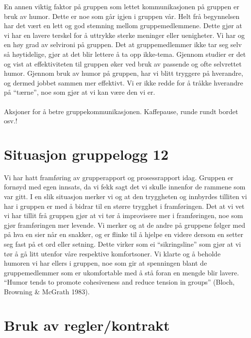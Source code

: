 En annen viktig faktor på gruppen som lettet kommunikasjonen på gruppen er bruk av humor. Dette er noe som går igjen i gruppen vår. Helt frå begynnelsen har det vært en lett og god stemning mellom gruppemedlemmene. Dette gjør at vi har en lavere terskel for å uttrykke sterke meninger eller uenigheter. Vi har og en høy grad av selvironi på gruppen. Det at gruppemedlemmer ikke tar seg selv så høytidelige, gjør at det blir lettere å ta opp ikke-tema. Gjennom studier er det og vist at effektiviteten til gruppen øker ved bruk av passende og ofte selvrettet humor. Gjennom bruk av humor på gruppen, har vi blitt tryggere på hverandre, og dermed jobbet sammen mer effektivt. Vi er ikke redde for å tråkke hverandre på ``tærne'', noe som gjør at vi kan være den vi er. 
\\
\\
Aksjoner for å betre gruppekommunikasjonen. Kaffepause, runde rundt bordet osv.!
\section{Situasjon gruppelogg 12}
Vi har hatt framføring av grupperapport og prosessrapport idag. Gruppen er fornøyd med egen innsats, da vi fekk sagt det vi skulle innenfor de rammene som var gitt. I en slik situasjon merker vi og at den tryggheten og innbyrdes tilliten vi har i gruppen er med å bidrar til en større trygghet i framføringen. Det at vi vet vi har tillit frå gruppen gjør at vi tør å improvisere mer i framføringen, noe som gjør framføringen mer levende. Vi merker og at de andre på gruppene følger med på hva en sier når en snakker, og er flinke til å hjelpe en videre dersom en setter seg fast på et ord eller setning. Dette virker som ei ``sikringsline'' som gjør at vi tør å gå litt utenfor våre respektive komfortsoner. Vi klarte og å beholde humoren vi har ellers i gruppen, noe som gir at spenningen blant de gruppemedlemmer som er ukomfortable med å stå foran en mengde blir lavere. ``Humor tends to promote cohesiveness and reduce tension in groups'' (Bloch, Browning \& McGrath 1983).


\section{Bruk av regler/kontrakt}

